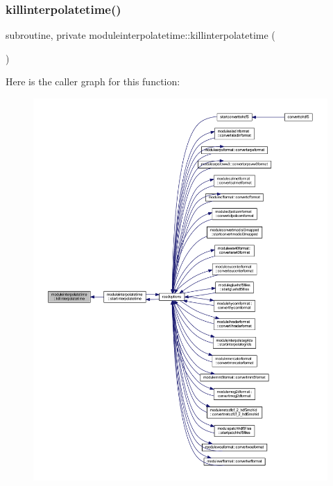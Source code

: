 \subsubsection{\texorpdfstring{killinterpolatetime()}{killinterpolatetime()}}
{\footnotesize\ttfamily subroutine, private moduleinterpolatetime\+::killinterpolatetime (\begin{DoxyParamCaption}{ }\end{DoxyParamCaption})\hspace{0.3cm}{\ttfamily [private]}}

Here is the caller graph for this function\+:\nopagebreak
\begin{figure}[H]
\begin{center}
\leavevmode
\includegraphics[width=350pt]{namespacemoduleinterpolatetime_a8b49478334350c51e3c3ffbd530b77c7_icgraph}
\end{center}
\end{figure}
\mbox{\label{namespacemoduleinterpolatetime_af0bb28d64bc31ae488ca76a682f246f5}} 
